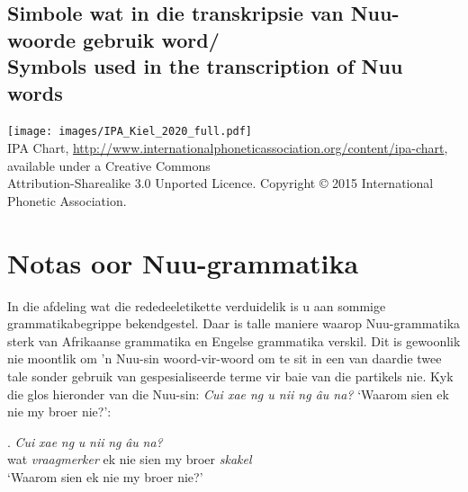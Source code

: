 \pagebreak


\markboth{}{}
\subsection{Simbole wat in die transkripsie van
N\textipa{\textvertline}uu-woorde gebruik word/\\Symbols used in the
transcription of N\textipa{\textvertline}uu words}
\label{s:symbols}
\markboth{}{}

\texttt{[image: images/IPA\_Kiel\_2020\_full.pdf]}\\
{\small IPA Chart,
\url{http://www.internationalphoneticassociation.org/content/ipa-chart},
available under a Creative Commons\\Attribution-Sharealike 3.0 Unported
Licence. Copyright \copyright{} 2015 International Phonetic
Association.}



\markboth{}{}
\section{Notas oor N\textipa{\textvertline}uu-grammatika}
\markboth{}{}

In die afdeling wat die rededeeletikette verduidelik is u aan sommige
grammatikabegrippe bekendgestel. Daar is talle maniere waarop
N\textipa{\textvertline}uu-grammatika sterk van Afrikaanse grammatika
en Engelse grammatika verskil. Dit is gewoonlik nie moontlik om 'n
N\textipa{\textvertline}uu-sin woord-vir-woord om te sit in een van
daardie twee tale sonder gebruik van gespesialiseerde terme vir baie
van die partikels nie. Kyk die glos hieronder van die
N\textipa{\textvertline}uu-sin: \emph{Cui xae ng
\textipa{\textdoublevertline}u n\textipa{\textvertline}ii ng
\textipa{\textdoublevertline}\^{a}u n\textipa{\textdoublevertline}a?}
`Waarom sien ek nie my broer nie?':

\exg.
\emph{Cui} \emph{xae} \emph{ng} \emph{\textipa{\textdoublevertline}u}
\emph{n\textipa{\textvertline}ii} \emph{ng}
\emph{\textipa{\textdoublevertline}\^{a}u}
\emph{n\textipa{\textdoublevertline}a?}\\
wat \emph{vraagmerker} ek nie sien my broer \emph{skakel}\\
`Waarom sien ek nie my broer nie?' \parencite[66, voorbeeld 31]{Collins2011}

